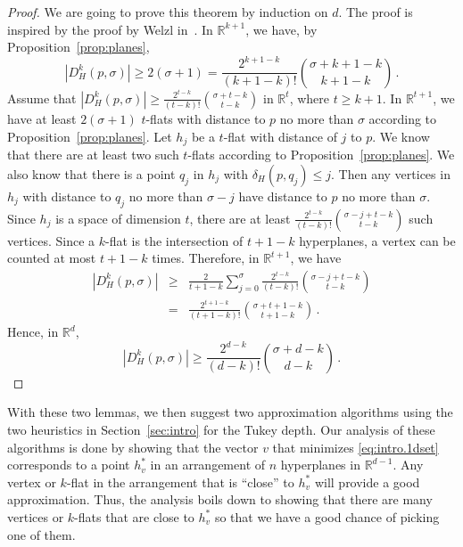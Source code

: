 \documentclass [letterpaper] {article}
\begin{document}
\begin{proof}%
  We are going to prove this theorem by induction on $d$. The proof is inspired by the proof by Welzl in~\cite{welzl92}. In $\mathbb{R}^{k+1}$, we have, by Proposition~\ref{prop:planes},
  \begin{equation}
    |D_{H}^{k}(p,\sigma)| \geq 2(\sigma+1) = \frac{2^{k+1-k}}{(k+1-k)!}\binom{\sigma + k+1-k}{k+1-k} \, . \nonumber
  \end{equation}
  Assume that $|D_{H}^{k}(p,\sigma)| \geq \frac{2^{t-k}}{(t-k)!}\binom{\sigma + t-k}{t-k}$ in $\mathbb{R}^{t}$, where $t \geq k + 1$. In $\mathbb{R}^{t+1}$, we have at least $2(\sigma+1)$ $t$-flats with distance to $p$ no more than $\sigma$ according to Proposition~\ref{prop:planes}. Let $h_{j}$ be a $t$-flat with distance of $j$ to $p$. We know that there are at least two such $t$-flats according to Proposition~\ref{prop:planes}. We also know that there is a point $q_{j}$ in $h_{j}$ with $\delta_{H}(p,q_{j}) \leq j$. Then any vertices in $h_{j}$ with distance to $q_{j}$ no more than $\sigma - j$ have distance to $p$ no more than $\sigma$. Since $h_{j}$ is a space of dimension $t$, there are at least $\frac{2^{t-k}}{(t-k)!}\binom{\sigma - j + t-k}{t-k}$ such vertices. Since a $k$-flat is the intersection of $t+1-k$ hyperplanes, a vertex can be counted at most $t+1-k$ times. Therefore, in $\mathbb{R}^{t+1}$, we have
  \begin{eqnarray}
    |D_{H}^{k}(p,\sigma)| & \geq & \frac{2}{t+1-k}\sum_{j=0}^{\sigma}\frac{2^{t-k}}{(t-k)!}\binom{\sigma - j + t-k}{t-k} \nonumber \\
    & = & \frac{2^{t+1-k}}{(t+1-k)!}\binom{\sigma + t + 1 - k}{t+1-k} \, . \nonumber
  \end{eqnarray}
  Hence, in $\mathbb{R}^{d}$,
  \begin{equation}
    |D_{H}^{k}(p,\sigma)| \geq \frac{2^{d-k}}{(d-k)!}\binom{\sigma + d-k}{d-k} \, . \nonumber
  \end{equation}
\end{proof}

With these two lemmas, we then suggest two approximation algorithms using the two heuristics in Section~\ref{sec:intro} for the Tukey depth. Our analysis of these algorithms is done by showing that the vector $v$ that minimizes \eqref{eq:intro.1dset} corresponds to a point $h_{v}^{*}$ in an arrangement of $n$ hyperplanes in $\mathbb{R}^{d-1}$. Any vertex or $k$-flat in the arrangement that is ``close'' to $h_{v}^{*}$ will provide a good approximation. Thus, the analysis boils down to showing that there are many vertices or $k$-flats that are close to $h_{v}^{*}$ so that we have a good chance of picking one of them.
\end{document}
